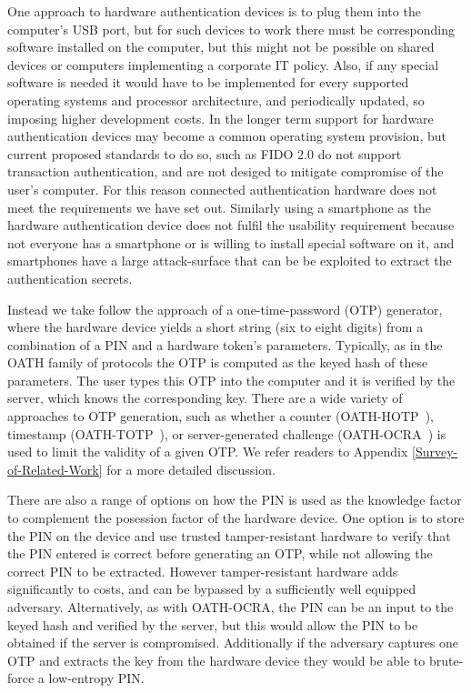 One approach to hardware authentication devices is to plug them into the computer's USB port, but for such devices to work there must be corresponding software installed on the computer, but this might not be possible on shared devices or computers implementing a corporate IT policy.
Also, if any special software is needed it would have to be implemented for every supported operating systems and processor architecture, and periodically updated, so imposing higher development costs.
In the longer term support for hardware authentication devices may become a common operating system provision, but current proposed standards to do so, such as FIDO 2.0 do not support transaction authentication, and are not desiged to mitigate compromise of the user's computer.
For this reason connected authentication hardware does not meet the requirements we have set out.
Similarly using a smartphone as the hardware authentication device does not fulfil the usability requirement because not everyone has a smartphone or is willing to install special software on it, and smartphones have a large attack-surface that can be be exploited to extract the authentication secrets.

Instead we take follow the approach of a one-time-password (OTP) generator, where the hardware device yields a short string (\eg six to eight digits) from a combination of a PIN and a hardware token's parameters. Typically, as in the OATH family of protocols the OTP is computed as the keyed hash of these parameters. The user types this OTP into the computer and it is verified by the server, which knows the corresponding key. There are a wide variety of approaches to OTP generation, such as whether a counter (\eg OATH-HOTP~\cite{oath-hotp}), timestamp (\eg OATH-TOTP~\cite{oath-totp}), or server-generated challenge (\eg OATH-OCRA~\cite{oath-ocra}) is used to limit the validity of a given OTP.  We refer readers to Appendix \ref{Survey-of-Related-Work} for a more detailed discussion.

There are also a range of options on how the PIN is used as the knowledge factor to complement the posession factor of the hardware device.
One option is to store the PIN on the device and use trusted tamper-resistant hardware to verify that the PIN entered is correct before generating an OTP, while not allowing the correct PIN to be extracted.
However tamper-resistant hardware adds significantly to costs, and can be bypassed by a sufficiently well equipped adversary.
Alternatively, as with OATH-OCRA, the PIN can be an input to the keyed hash and verified by the server, but this would allow the PIN to be obtained if the server is compromised.
Additionally if the adversary captures one OTP and extracts the key from the hardware device they would be able to brute-force a low-entropy PIN.

